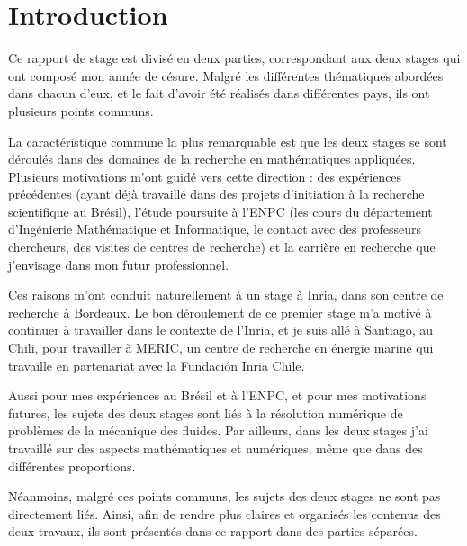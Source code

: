 \part*{Introduction}

\indent Ce rapport de stage est divisé en deux parties, correspondant aux deux stages qui ont composé mon année de césure. Malgré les différentes thématiques abordées dans chacun d'eux, et le fait d'avoir été réalisés dans différentes pays, ils ont plusieurs points communs.

\indent La caractéristique commune la plus remarquable est que les deux stages se sont déroulés dans des domaines de la recherche en mathématiques appliquées. Plusieurs motivations m'ont guidé vers cette direction : des expériences précédentes (ayant déjà travaillé dans des projets d'initiation à la recherche scientifique au Brésil), l'étude poursuite à l'ENPC (les cours du département d’Ingénierie Mathématique et Informatique, le contact avec des professeurs chercheurs, des visites de centres de recherche) et la carrière en recherche que j'envisage dans mon futur professionnel.

\indent Ces raisons m'ont conduit naturellement à un stage à Inria, dans son centre de recherche à Bordeaux. Le bon déroulement de ce premier stage m'a motivé à continuer à travailler dans le contexte de l'Inria, et je suis allé à Santiago, au Chili, pour travailler à MERIC, un centre de recherche en énergie marine qui travaille en partenariat avec la Fundación Inria Chile.

\indent Aussi pour mes expériences au Brésil et à l'ENPC, et pour mes motivations futures, les sujets des deux stages sont liés à la résolution numérique de problèmes de la mécanique des fluides. Par ailleurs, dans les deux stages j'ai travaillé sur des aspects mathématiques et numériques, même que dans des différentes proportions. 

\indent Néanmoins, malgré ces points communs, les sujets des deux stages ne sont pas directement liés. Ainsi, afin de rendre plus claires et organisés les contenus des deux travaux, ils sont présentés dans ce rapport dans des parties séparées.
